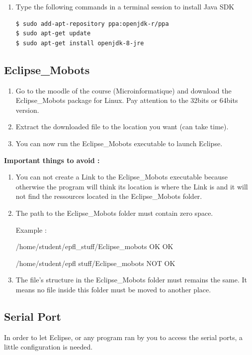 \documentclass[a4paper]{article}
\begin{document}
\begin{enumerate}
\item Type the following commands in a terminal session to install Java SDK
\begin{lstlisting}
$ sudo add-apt-repository ppa:openjdk-r/ppa
$ sudo apt-get update
$ sudo apt-get install openjdk-8-jre
\end{lstlisting}
\end{enumerate}


\subsection{Eclipse\_Mobots}

\begin{enumerate}
\item Go to the moodle of the course (Microinformatique) and download the Eclipse\_Mobots package for Linux.
Pay attention to the 32bits or 64bits version.
\item Extract the downloaded file to the location you want (can take time). 
\item You can now run the Eclipse\_Mobots executable to launch Eclipse.
\end{enumerate}

\textbf{Important things to avoid :}

\begin{enumerate}
\item You can not create a Link to the Eclipse\_Mobots executable because otherwise the program will think its location is where the Link is and it will not find the ressources located in the Eclipse\_Mobots folder.
\item The path to the Eclipse\_Mobots folder must contain zero space. 

Example :

/home/student/epfl\_stuff/Eclipse\_mobots OK   OK

/home/student/epfl stuff/Eclipse\_mobots NOT OK

\item The file's structure in the Eclipse\_Mobots folder must remains the same. It means no file inside this folder must be moved to another place.
\end{enumerate}

\subsection{Serial Port}

In order to let Eclipse, or any program ran by you to access the serial ports, a little configuration is needed.
\end{document}

